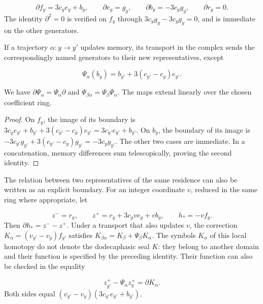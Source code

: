 \[
\partial f_y=3c_y e_y+b_y,\qquad
\partial e_y=g_y,\qquad
\partial b_y=-3c_y g_y,\qquad
\partial r_y=0.
\]
The identity \(\partial^2=0\) is verified on \(f_y\) through \(3c_yg_y-3c_yg_y=0\), and is immediate on the other generators.

If a trajectory \(\alpha:y\to y'\) updates memory, its transport in the complex sends the correspondingly named generators to their new representatives, except

\[
\Psi_\alpha(b_y)=b_{y'}+3(c_{y'}-c_y)e_{y'}.
\]
\begin{proposition}
\label{hmtfg:base:prop:continuo-naturalidad-memoria}
We have \(\partial\Psi_\alpha=\Psi_\alpha\partial\) and \(\Psi_{\beta\alpha}=\Psi_\beta\Psi_\alpha\). The maps extend linearly over the chosen coefficient ring.
\end{proposition}
\begin{proof}
On \(f_y\), the image of its boundary is \(3c_ye_{y'}+b_{y'}+3(c_{y'}-c_y)e_{y'} =3c_{y'}e_{y'}+b_{y'}\). On \(b_y\), the boundary of its image is \(-3c_{y'}g_{y'}+3(c_{y'}-c_y)g_{y'}=-3c_yg_{y'}\). The other two cases are immediate. In a concatenation, memory differences sum telescopically, proving the second identity.
\end{proof}

The relation between two representatives of the same residence can also be written as an explicit boundary. For an integer coordinate \(v\), reduced in the same ring where appropriate, let

\[
z^-=r_y,\qquad z^+=r_y+3c_yv e_y+v b_y,
\qquad h_*=-vf_y.
\]
Then \(\partial h_*=z^--z^+\). Under a transport that also updates \(v\), the correction \(K_\alpha=(v_{y'}-v_y)f_{y'}\) satisfies \(K_{\beta\alpha}=K_\beta+\Psi_\beta K_\alpha\). The symbols \(K_\alpha\) of this local homotopy do not denote the dodecaphasic seal \(K\): they belong to another domain and their function is specified by the preceding identity. Their function can also be checked in the equality

\[
z^+_{y'}-\Psi_\alpha z^+_y=\partial K_\alpha.
\]
Both sides equal \((v_{y'}-v_y)(3c_{y'}e_{y'}+b_{y'})\).

